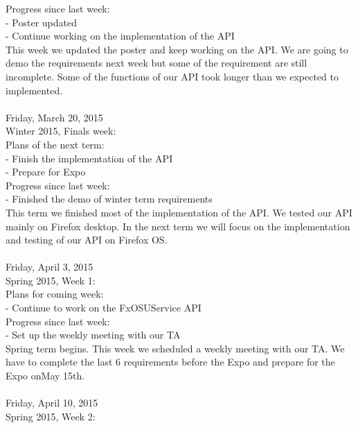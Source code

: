 {Progress since last week: \\
- Poster updated \\
- Continue working on the implementation of the API \\

This week we updated the poster and keep working on the API. We are going to demo the requirements next week but some of the requirement are still incomplete. Some of the functions of our API took longer than we expected to implemented. \\

\hrulefill \\
Friday, March 20, 2015 \\
Winter 2015, Finals week: \\

Plans of the next term: \\
- Finish the implementation of the API \\
- Prepare for Expo \\

Progress since last week: \\
- Finished the demo of winter term requirements \\

This term we finished most of the implementation of the API.  We tested our API mainly on Firefox desktop. In the next term we will focus on the implementation and testing of our API on Firefox OS. \\

\hrulefill \\
Friday, April 3, 2015 \\
Spring 2015, Week 1: \\

Plans for coming week: \\
- Continue to work on the FxOSUService API \\

Progress since last week: \\
- Set up the weekly meeting with our TA \\

Spring term begins. This week we scheduled a weekly meeting with our TA. We have to complete the last 6 requirements before the Expo and prepare for the Expo onMay 15th. \\

\hrulefill \\
Friday, April 10, 2015 \\
Spring 2015, Week 2: \\

}
